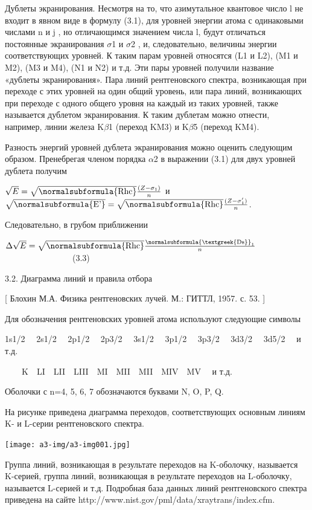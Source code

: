 \documentclass[a4paper,14pt, openany, twoside, draft]{extbook} %
\begin{document}
Дублеты экранирования. Несмотря на то, что азимутальное квантовое число l не входит в явном виде в формулу (3.1), для уровней энергии атома с одинаковыми числами n и j , но отличающимся значением числа l,  будут отличаться постоянные экранирования ${\sigma}$1  и ${\sigma}$2 , и, следовательно, величины энергии соответствующих уровней. К таким парам уровней относятся (L1 и L2), (M1 и M2), (M3 и M4), (N1 и N2) и т.д. Эти пары уровней получили название «дублеты экранирования». Пара линий рентгеновского спектра, возникающая при переходе с этих уровней на один общий уровень, или пара линий, возникающих при переходе с одного общего уровня на каждый из таких уровней, также называется дублетом экранирования. К таким дублетам можно отнести, например, линии железа K${\beta}$1 (переход KM3) и K${\beta}$5 (переход KM4).

Разность энергий уровней дублета экранирования можно оценить следующим образом. Пренебрегая членом порядка ${\alpha}$2 в выражении (3.1) для двух уровней дублета получим

 $\sqrt E=\sqrt{\normalsubformula{\text{Rhc}}}\frac{(Z-\sigma _1)} n$ и $\sqrt{\normalsubformula{\text{E'}}}=\sqrt{\normalsubformula{\text{Rhc}}}\frac{(Z-\sigma _1')} n$.

Следовательно, в грубом приближении

 $\Delta \sqrt E=\sqrt{\normalsubformula{\text{Rhc}}}\frac{\normalsubformula{\text{\textgreek{Ds}}}_1} n$\ \ \ \ \ \ \ \ \ \ \ \ \ \ \ \ (3.3)

3.2. Диаграмма линий и правила отбора

[ Блохин М.А. Физика рентгеновских лучей. М.: ГИТТЛ, 1957. с. 53. ]

Для обозначения рентгеновских уровней атома используют следующие символы

1s1/2  \ \ 2s1/2  \ \ 2p1/2  \ \ 2p3/2  \ \ 3s1/2  \ \ 3p1/2  \ \ 3p3/2  \ \ 3d3/2  \ \ 3d5/2  \ \ и т.д.

\ \ \ \ K\ \ LI\ \ LII\ \ LIII\ \ MI\ \ MII\ \ MII\ \ MIV\ \ MV \ \ и т.д.

Оболочки с n=4, 5, 6, 7 обозначаются буквами N, O, P, Q.

На рисунке приведена диаграмма переходов, соответствующих основным линиям K{}- и L{}-серии рентгеновского спектра.

 \texttt{[image: a3-img/a3-img001.jpg]}

Группа линий, возникающая в результате переходов на K-оболочку, называется K-серией, группа линий, возникающая в результате переходов на L-оболочку, называется L-серией и т.д. Подробная база данных линий рентгеновского спектра приведена на сайте http://www.nist.gov/pml/data/xraytrans/index.cfm.
\end{document}
